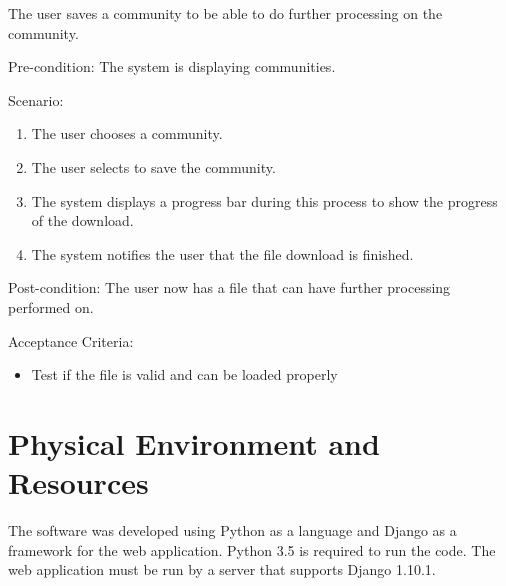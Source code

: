 The user saves a community to be able to do further processing on the community.




Pre-condition: The system is displaying communities.




Scenario:
\begin{enumerate}
\item The user chooses a community.
\item The user selects to save the community.
\item The system displays a progress bar during this process to show the progress of the download.
\item The system notifies the user that the file download is finished.
\end{enumerate}




Post-condition: The user now has a file that can have further processing performed on.




Acceptance Criteria:
\begin{itemize}
\item Test if the file is valid and can be loaded properly
\end{itemize}


\section{Physical Environment and Resources}
The software was developed using Python as a language and Django as a framework for the web application. Python 3.5 is required to run the code. The web application must be run by a server that supports Django 1.10.1. 
